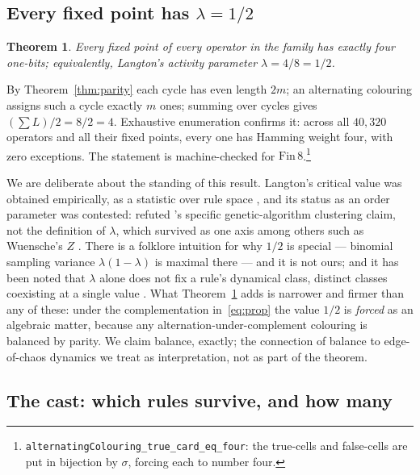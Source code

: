 \documentclass[man,12pt,floatsintext]{apa7}
\newcommand{\sig}{\sigma}
\newtheorem{theorem}{Theorem}
\begin{document}
\subsection{Every fixed point has $\lambda = 1/2$}

\begin{theorem}\label{thm:lambda}
Every fixed point of every operator in the family has exactly four one-bits;
equivalently, Langton's activity parameter $\lambda = 4/8 = 1/2$.
\end{theorem}

\noindent By Theorem~\ref{thm:parity} each cycle has even length $2m$; an
alternating colouring assigns such a cycle exactly $m$ ones; summing over
cycles gives $(\sum L)/2 = 8/2 = 4$. Exhaustive enumeration confirms it:
across all $40{,}320$ operators and all their fixed points, every one has
Hamming weight four, with zero exceptions. The statement is machine-checked
for $\mathrm{Fin}\,8$.\footnote{%
\texttt{alternatingColouring\_true\_card\_eq\_four}: the true-cells and
false-cells are put in bijection by $\sig$, forcing each to number four.}

We are deliberate about the standing of this result. Langton's critical
value was obtained empirically, as a statistic over rule space
\parencite{langton1990computation}, and its status as an order parameter
was contested: \textcite{mitchell1993revisiting} refuted
\textcite{packard1988adaptation}'s specific genetic-algorithm clustering
claim, not the definition of $\lambda$, which survived as one axis among
others such as Wuensche's $Z$ \parencite{wuensche1999classifying}. There is
a folklore intuition for why $1/2$ is special --- binomial sampling variance
$\lambda(1-\lambda)$ is maximal there --- and it is not ours; and it has been
noted that $\lambda$ alone does not fix a rule's dynamical class, distinct
classes coexisting at a single value \parencite{sakai2002edge}. What
Theorem~\ref{thm:lambda} adds is narrower and firmer than any of these: under
the complementation in~\eqref{eq:prop} the value $1/2$ is \emph{forced} as an
algebraic matter, because any alternation-under-complement colouring is
balanced by parity. We claim balance, exactly; the connection of balance to
edge-of-chaos dynamics we treat as interpretation, not as part of the
theorem.

\subsection{The cast: which rules survive, and how many}
\end{document}
